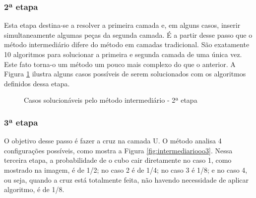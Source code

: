 \subsubsection{2ª etapa}

Esta etapa destina-se a resolver a primeira camada e, em alguns casos, inserir simultaneamente algumas peças da segunda camada. É a partir desse passo que o método intermediário difere do método em camadas tradicional. São exatamente 10 algoritmos para solucionar a primeira e segunda camada de uma única vez. Este fato torna-o um método um pouco mais complexo do que o anterior. A Figura \ref{fig:intermediario2} ilustra alguns casos possíveis de serem solucionados com os algoritmos definidos dessa etapa.

\begin{figure}[!htb]
    \centering
    \quad %
    \quad %
\caption{Casos solucionáveis pelo método intermediário - 2ª etapa}
\label{fig:intermediario2}
\end{figure}

\subsubsection{3ª etapa}

O objetivo desse passo é fazer a cruz na camada U. O método analisa 4 configurações possíveis, como mostra a Figura \ref{fig:intermediariooo3}. Nessa terceira etapa, a probabilidade de o cubo cair diretamente no caso 1, como mostrado na imagem, é de 1/2; no caso 2 é de 1/4; no caso 3 é 1/8; e no caso 4, ou seja, quando a cruz está totalmente feita, não havendo necessidade de aplicar algoritmo, é de 1/8.

